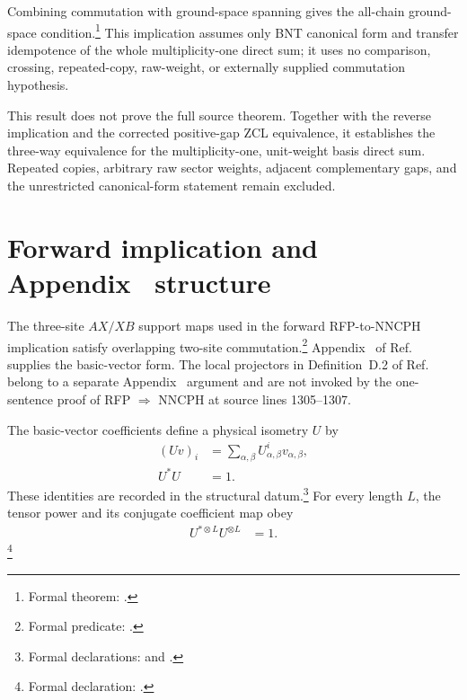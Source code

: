 \documentclass{article}
\begin{document}
Combining commutation with ground-space spanning gives the all-chain
ground-space condition.\footnote{Formal theorem:
.}
This implication assumes only BNT canonical form and transfer idempotence of
the whole multiplicity-one direct sum; it uses no comparison, crossing,
repeated-copy, raw-weight, or externally supplied commutation hypothesis.

This result does not prove the full source theorem. Together with the reverse
implication and the corrected positive-gap ZCL equivalence, it establishes the
three-way equivalence for the multiplicity-one, unit-weight basis direct sum.
Repeated copies, arbitrary raw sector weights, adjacent complementary gaps,
and the unrestricted canonical-form statement remain excluded.

\section{Forward implication and Appendix~ structure}

The three-site $AX/XB$ support maps used in the forward
RFP-to-NNCPH implication satisfy overlapping two-site commutation.\footnote{Formal
predicate: .}
Appendix~ of Ref.~\cite{Cirac2016MPDO_arXiv} supplies the
basic-vector form. The local projectors in Definition~D.2 of
Ref.~\cite{Cirac2016MPDO_arXiv} belong to a separate
Appendix~ argument and are not invoked by the
one-sentence proof of RFP $\Rightarrow$ NNCPH at source lines 1305--1307.

The basic-vector coefficients define a physical isometry $U$ by
\begin{align}
    (Uv)_i
        &=\sum_{\alpha,\beta}
        U^i_{\alpha,\beta}v_{\alpha,\beta},
    \label{eq:cpsv16_nncph_ground_state_scope_physical_isometry_action}\\
    U^*U
        &=1.
    \label{eq:cpsv16_nncph_ground_state_scope_physical_isometry_left_inverse}
\end{align}
These identities are recorded in the structural datum.\footnote{Formal
declarations:  and
.}
For every length $L$, the tensor power and its conjugate coefficient map obey
\begin{align}
    U^{*\otimes L}U^{\otimes L}
        &=1.
    \label{eq:cpsv16_nncph_ground_state_scope_tensor_power_left_inverse}
\end{align}
\footnote{Formal declaration:
.}
\end{document}
